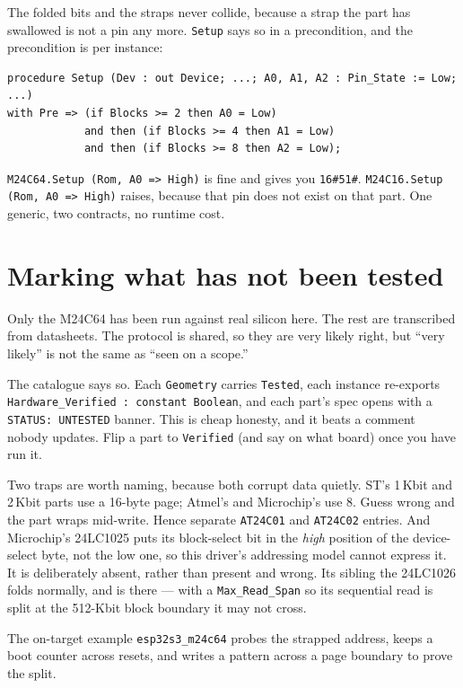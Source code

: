 The folded bits and the straps never collide, because a strap the part has
swallowed is not a pin any more. \texttt{Setup} says so in a precondition, and the
precondition is per instance:

\begin{lstlisting}
procedure Setup (Dev : out Device; ...; A0, A1, A2 : Pin_State := Low; ...)
with Pre => (if Blocks >= 2 then A0 = Low)
            and then (if Blocks >= 4 then A1 = Low)
            and then (if Blocks >= 8 then A2 = Low);
\end{lstlisting}

\noindent \texttt{M24C64.Setup (Rom, A0 => High)} is fine and gives you
\texttt{16\#51\#}. \texttt{M24C16.Setup (Rom, A0 => High)} raises, because that pin
does not exist on that part. One generic, two contracts, no runtime cost.

\section{Marking what has not been tested}

Only the M24C64 has been run against real silicon here. The rest are transcribed
from datasheets. The protocol is shared, so they are very likely right, but
``very likely'' is not the same as ``seen on a scope.''

The catalogue says so. Each \texttt{Geometry} carries \texttt{Tested}, each
instance re-exports \texttt{Hardware\_Verified : constant Boolean}, and each
part's spec opens with a \texttt{STATUS: UNTESTED} banner. This is cheap honesty,
and it beats a comment nobody updates. Flip a part to \texttt{Verified} (and say
on what board) once you have run it.

Two traps are worth naming, because both corrupt data quietly. ST's 1\,Kbit and
2\,Kbit parts use a 16-byte page; Atmel's and Microchip's use 8. Guess wrong and
the part wraps mid-write. Hence separate \texttt{AT24C01} and \texttt{AT24C02}
entries. And Microchip's 24LC1025 puts its block-select bit in the \emph{high}
position of the device-select byte, not the low one, so this driver's addressing
model cannot express it. It is deliberately absent, rather than present and wrong.
Its sibling the 24LC1026 folds normally, and is there --- with a
\texttt{Max\_Read\_Span} so its sequential read is split at the 512-Kbit block
boundary it may not cross.

\noindent The on-target example \texttt{esp32s3\_m24c64} probes the strapped
address, keeps a boot counter across resets, and writes a pattern across a page
boundary to prove the split.
